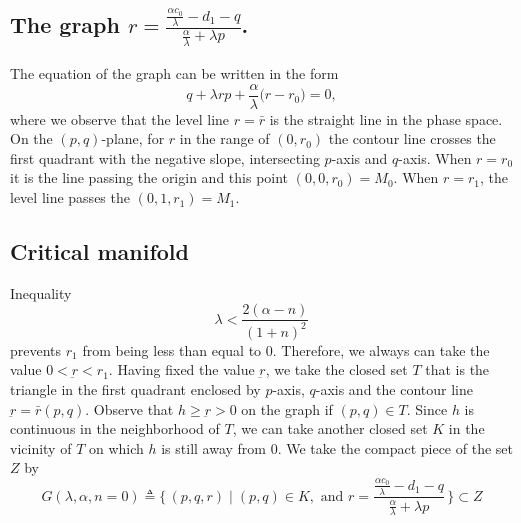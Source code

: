\documentclass[a4paper,11pt]{article}
\begin{document}
\subsection*{The graph $\displaystyle r=\frac{ \frac{\alpha c_0}{\lambda} - d_1 -q }{ \frac{\alpha}{\lambda} + \lambda p}$.}
The equation of the graph can be written in the form
\begin{equation}
 q + \lambda {r}p + \frac{\alpha}{\lambda} \Big( r-r_0\Big)=0, \label{eq:level}
\end{equation}
where we observe that the level line $r=\bar{r}$ is the straight line in the phase space. On the $(p,q)$-plane, for $r$ in the range of $(0,r_0)$ the contour line crosses the first quadrant with the negative slope, intersecting $p$-axis and $q$-axis. When $r=r_0$ it is the line passing the origin and this point $(0,0,r_0) = M_0$. When $r=r_1$, the level line passes the $(0,1,r_1)=M_1$.

\subsection*{Critical manifold}
Inequality
$$ \lambda < \frac{2(\alpha-n)}{(1+n)^2} $$
prevents $r_1$ from being less than equal to $0$. Therefore, we always can take the value $0<\underbar{r}<r_1$. Having fixed the value $\underbar{r}$, we take the closed set $T$ that is the triangle in the first quadrant enclosed by $p$-axis, $q$-axis and the contour line $\underbar{r} = \bar{r}(p,q)$. Observe that $h\ge\underbar{r}>0$ on the graph if $(p,q) \in T$. Since $h$ is continuous in the neighborhood of $T$, we can take another closed set $K$ in the vicinity of $T$ on which $h$ is still away from $0$. We take the compact piece of the set $Z$ by
\begin{equation}
 G(\lambda,\alpha,n=0) \triangleq \Big\{\, (p,q,r) \;|\; (p,q) \in K, \text{ and } r=\frac{ \frac{\alpha c_0}{\lambda} - d_1 -q }{ \frac{\alpha}{\lambda} + \lambda p} \,\Big\} \subset Z
\end{equation}
\end{document}
